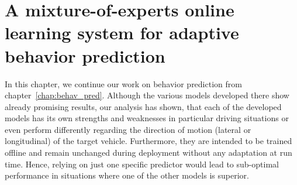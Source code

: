 \chapter{A mixture-of-experts online learning system for adaptive behavior prediction}
\label{chap:mix_online_learning}

In this chapter, we continue our work on behavior prediction from chapter~\ref{chap:behav_pred}.
Although the various models developed there show already promising results, our analysis has shown, that each of the developed models has its own strengths and weaknesses in particular driving situations or even perform differently regarding the direction of motion (lateral or longitudinal) of the target vehicle.
Furthermore, they are intended to be trained offline and remain unchanged during deployment without any adaptation at run time.
Hence, relying on just one specific predictor would lead to sub-optimal performance in situations where one of the other models is superior.

